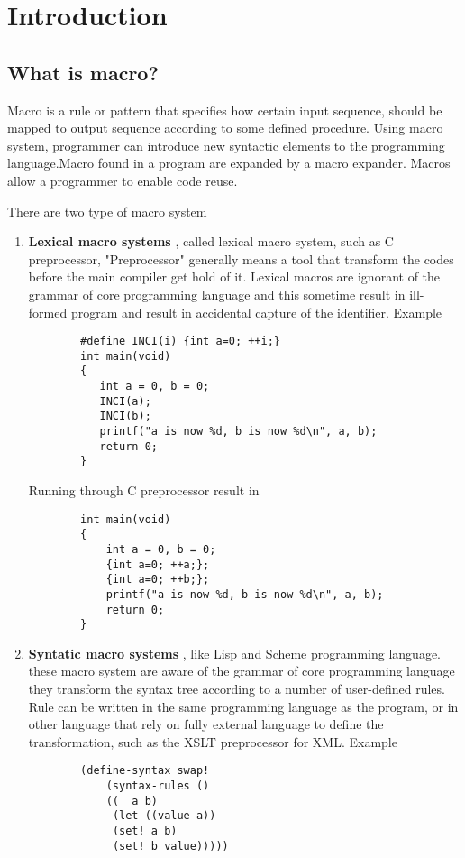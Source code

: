 \chapter{Introduction}

\section{What is macro?} 
Macro is a rule or pattern that specifies how certain input sequence, should be mapped to output sequence according to some defined procedure.  Using macro system, programmer can introduce new syntactic elements to the programming language.Macro found in a program are expanded by a macro expander. Macros allow a programmer to enable code reuse.

There are two type of macro system
\begin{enumerate}
\item {\bf Lexical macro systems }, called lexical macro system, such as C preprocessor, "Preprocessor" generally means a tool that transform the codes before the main compiler get hold of it. Lexical macros are ignorant of the grammar of core programming language and this sometime result in ill-formed program and result in accidental capture of the identifier.
 Example
\begin{lstlisting}
		#define INCI(i) {int a=0; ++i;}
		int main(void)
		{
 		   int a = 0, b = 0;
 		   INCI(a);
  		   INCI(b);
  		   printf("a is now %d, b is now %d\n", a, b);
  		   return 0;
		}
\end{lstlisting}

Running through C preprocessor result in
\begin{lstlisting}
		int main(void)
		{
    		int a = 0, b = 0;
    		{int a=0; ++a;};
    		{int a=0; ++b;};
    		printf("a is now %d, b is now %d\n", a, b);
    		return 0;
		}
\end{lstlisting}

\item {\bf Syntatic macro systems }, like Lisp and Scheme programming language. these macro system are aware of the grammar of core programming language they transform the syntax tree according to a number of user-defined rules. Rule can be written in the same programming language as the program, or in other language that rely on fully external language to define the transformation, such as the XSLT preprocessor for XML. Example

\begin{lstlisting}
		(define-syntax swap! 
   			(syntax-rules () 
     		((_ a b) 
     		 (let ((value a)) 
        	 (set! a b) 
        	 (set! b value))))) 
\end{lstlisting}
\end{enumerate}

